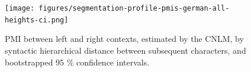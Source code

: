 \begin{figure}
\texttt{[image: figures/segmentation-profile-pmis-german-all-heights-ci.png]}
\caption{PMI between left and right contexts, estimated by the CNLM, by syntactic hierarchical distance between subsequent characters, and bootstrapped 95 \% confidence intervals.}\label{fig:syntax-depth}
\end{figure}





